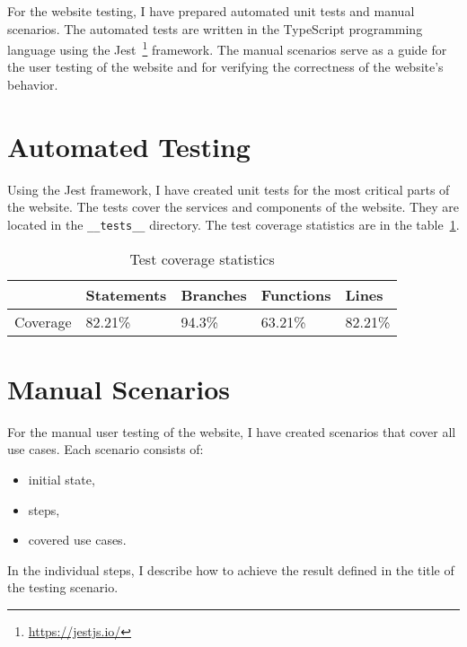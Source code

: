 For the website testing, I have prepared automated unit tests and manual scenarios.
The automated tests are written in the TypeScript programming language using the Jest~\footnote{\url{https://jestjs.io/}} framework.
The manual scenarios serve as a guide for the user testing of the website
and for verifying the correctness of the website's behavior.


\section{Automated Testing}
Using the Jest framework, I have created unit tests for the most critical parts of the website.
The tests cover the services and components of the website.
They are located in the \texttt{\_\_tests\_\_} directory.
The test coverage statistics are in the table~\ref{tab:tests-coverage}.

\begin{table}[hbt!]
    \centering
    \captionsetup{justification=centering}
    \begin{tabular}{|l|l|l|l|l|}
        \hline
        ~        & Statements & Branches & Functions & Lines   \\
        \hline
        Coverage & 82.21\%    & 94.3\%   & 63.21\%   & 82.21\% \\
        \hline
    \end{tabular}
    \caption{Test coverage statistics}
    \label{tab:tests-coverage}
\end{table}


\section{Manual Scenarios}
For the manual user testing of the website, I have created scenarios that cover all use cases.
Each scenario consists of:
\begin{itemize}
    \item initial state,
    \item steps,
    \item covered use cases.
\end{itemize}

In the individual steps, I describe how to achieve the result defined in the title of the testing scenario.

\newcommand{\testing}[2]{%
    \stepcounter{testingcounter}%
    \subsection{T\arabic{testingcounter} -- #1}
}


